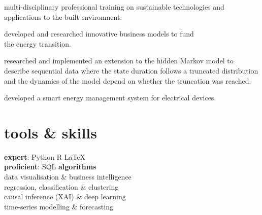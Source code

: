 \begin{minipage}[t]{0.66\textwidth}
\sectionspace %



\begin{tightitemize}
\item multi-disciplinary professional training on sustainable technologies and applications to the built environment.
\item developed and researched innovative business models to fund\\ the energy transition.
\end{tightitemize}
\sectionspace %


\begin{tightitemize}
\item researched and implemented an extension to the hidden Markov model to describe sequential data where the state duration follows a truncated distribution and the dynamics of the model depend on whether the truncation was reached.
\item developed a smart energy management system for electrical devices. 
\end{tightitemize}
\sectionspace %


\section{tools \& skills}
\textbf{expert}: Python \textbullet{} R \textbullet{} \LaTeX{}\\ 
\textbf{proficient}: \textbullet{} SQL 
\textbf{algorithms}\\\textbullet{} data visualisation \& business intelligence \\\textbullet{} regression, classification \& clustering\\ \textbullet{} causal inference (XAI) \& deep learning \\ \textbullet{} time-series modelling \& forecasting\\

\end{minipage} %
\vspace*{\fill}
\center{\textcolor{gray}{1/2}}


